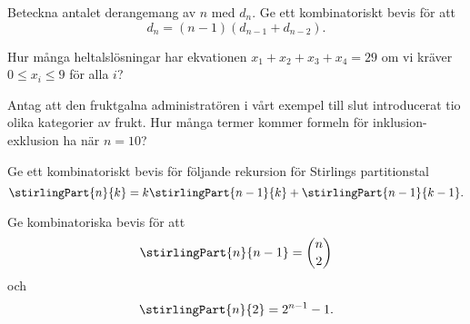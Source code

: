 \documentclass[nobib]{tufte-handout}
\begin{document}
\begin{xca}
  Beteckna antalet derangemang av $n$ med $d_n$. Ge ett kombinatoriskt bevis för att
  $$d_n = (n-1)(d_{n-1} + d_{n-2}).$$
\end{xca}

\begin{xca}
  Hur många heltalslösningar har ekvationen $x_1 + x_2 + x_3 + x_4 = 29$ om vi kräver $0 \leq x_i \leq 9$ för alla $i$?
\end{xca}

\begin{xca}
  Antag att den fruktgalna administratören i vårt exempel till slut introducerat tio olika kategorier av frukt. Hur många termer kommer formeln för inklusion-exklusion ha när $n = 10$?
\end{xca}

\begin{xca}
  Ge ett kombinatoriskt bevis för följande rekursion för Stirlings partitionstal
  $$\stirlingPart{n}{k} = k\stirlingPart{n-1}{k} + \stirlingPart{n-1}{k-1}.$$
\end{xca}

\begin{xca}
  Ge kombinatoriska bevis för att
  $$\stirlingPart{n}{n-1} = \binom{n}{2}$$
  och
  $$\stirlingPart{n}{2} = 2^{n-1} - 1.$$
\end{xca}

%
%
\end{document}
